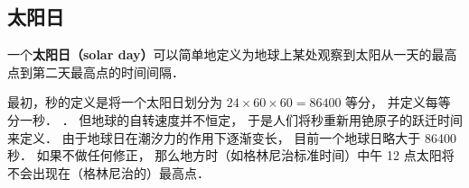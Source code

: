 
\subsection{太阳日}
一个\textbf{太阳日（solar day）}可以简单地定义为地球上某处观察到太阳从一天的最高点到第二天最高点的时间间隔．

最初，秒的定义是将一个太阳日划分为 $24\times60\times60 = 86400$ 等分， 并定义每等分一秒． ． 但地球的自转速度并不恒定， 于是人们将秒重新用铯原子的跃迁时间来定义． 由于地球日在潮汐力的作用下逐渐变长， 目前一个地球日略大于 86400 秒． 如果不做任何修正， 那么地方时（如格林尼治标准时间）中午 12 点太阳将不会出现在（格林尼治的）最高点．
